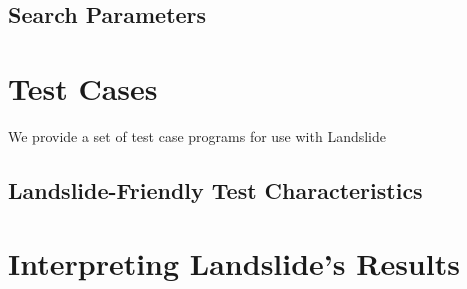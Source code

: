 \subsection{Search Parameters}
\label{sec:using-search}

\section{Test Cases}
\label{sec:using-tests}

We provide a set of test case programs for use with Landslide

\subsection{Landslide-Friendly Test Characteristics}
\label{sec:using-landslide-friendly-tests}

\section{Interpreting Landslide's Results}
\label{sec:using-interpreting}


